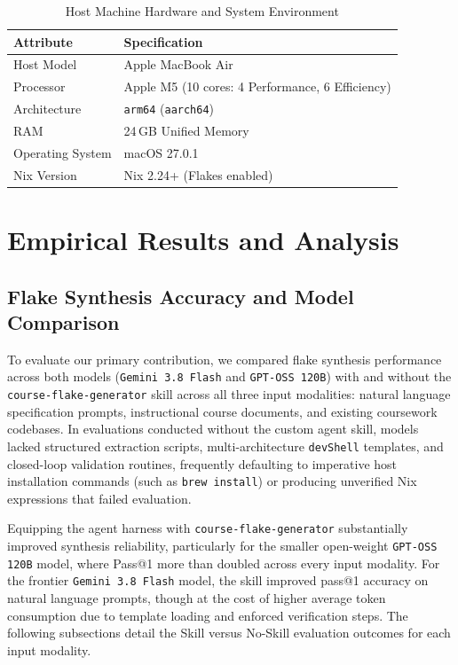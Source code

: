 \begin{table}[htbp]
	\centering
	\caption{Host Machine Hardware and System Environment}
	\label{tab:host-specifications}
	\begin{tabular}{ll}
		\toprule \textbf{Attribute} & \textbf{Specification}                           \\
		\midrule Host Model         & Apple MacBook Air                                \\
		Processor                   & Apple M5 (10 cores: 4 Performance, 6 Efficiency) \\
		Architecture                & \texttt{arm64} (\texttt{aarch64})                \\
		RAM                         & 24\,GB Unified Memory                            \\
		Operating System            & macOS 27.0.1                                     \\
		Nix Version                 & Nix 2.24+ (Flakes enabled)                       \\
		\bottomrule
	\end{tabular}
\end{table}

\chapter{Empirical Results and Analysis}
\label{chap:results}

\section{Flake Synthesis Accuracy and Model Comparison}
\label{sec:model-results}

To evaluate our primary contribution, we compared flake synthesis performance
across both models (\texttt{Gemini 3.8 Flash} and \texttt{GPT-OSS 120B}) with
and without the \texttt{course-flake-generator} skill across all three input modalities:
natural language specification prompts, instructional course documents, and
existing coursework codebases. In evaluations conducted without the custom agent skill,
models lacked structured extraction scripts, multi-architecture \texttt{devShell}
templates, and closed-loop validation routines, frequently defaulting to
imperative host installation commands (such as \texttt{brew install}) or producing
unverified Nix expressions that failed evaluation.

Equipping the agent harness with \texttt{course-flake-generator} substantially
improved synthesis reliability, particularly for the smaller open-weight \texttt{GPT-OSS
	120B} model, where Pass@1 more than doubled across every input modality. For the
frontier \texttt{Gemini 3.8 Flash} model, the skill improved pass@1 accuracy on
natural language prompts, though at the cost of higher average token consumption due
to template loading and enforced verification steps. The following subsections
detail the Skill versus No-Skill evaluation outcomes for each input modality.

